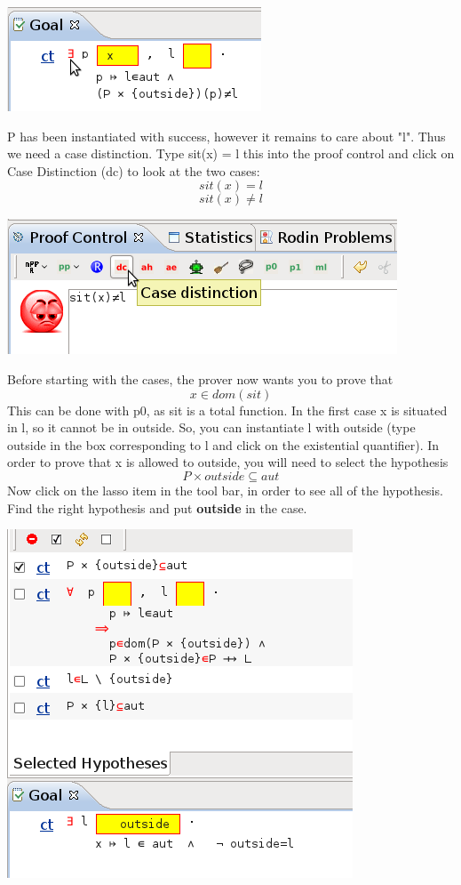 \begin{center}
	\includegraphics[]{img/tutorial/tut_10_instantiate_p.png}
\end{center}

P has been instantiated with success, however it remains to care about "l". Thus we need a case distinction.
Type sit(x) = l this into the proof control and click on Case Distinction (dc) to look at the two cases:
\[
sit(x)=l 
\]
\[
sit(x) \neq l
\]
\begin{center}
	\includegraphics[]{img/tutorial/tut_10_case_distinction.png}
\end{center}

Before starting with the cases, the prover now wants you to prove that 
\[
 x \in dom(sit)
\]
This can be done with p0, as sit is a total function. In the first case x is situated in l, so it cannot be in outside. So, you can instantiate l with outside (type outside in the box corresponding to l and click on the existential quantifier). In order to prove that x is allowed to outside, you will need to select the hypothesis
\[
P \times outside \subseteq aut
\]
Now click on the lasso item in the tool bar, in order to see all of the hypothesis. Find the right hypothesis and put \textbf{outside} in the case.
\begin{center}
	\includegraphics[]{img/tutorial/tut_10_outside.png}
\end{center}

